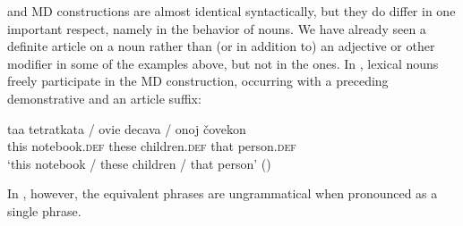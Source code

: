 \documentclass[output=paper]{langscibook}
\begin{document}
\ea \label{yourphonem}
\z\z

\noindent {} and  MD constructions are almost identical syntactically, but they do differ in one important respect, namely in the behavior of nouns. We have already seen a definite article on a noun rather than (or in addition to) an adjective or other modifier in some of the  examples above, but not in the  ones. In , lexical nouns freely participate in the MD construction, occurring with a preceding demonstrative and an article suffix:


\ea
\gll taa tetratkata / ovie decava / onoj čovekon \\
this notebook.\textsc{def} { } these children.\textsc{def} { } that person.\textsc{def} \\
\glt `this notebook / these children / that person' \hfill()
\z

\begin{sloppypar}
\noindent In , however, the equivalent phrases are ungrammatical when pronounced as a single phrase.
\end{sloppypar}

\end{document}
